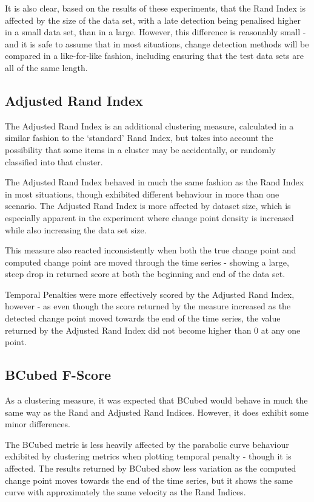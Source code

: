 \documentclass[../main.tex]{subfiles}
\begin{document}
It is also clear, based on the results of these experiments, that the Rand Index is affected by the size of the data set, with a late detection being penalised higher in a small data set, than in a large. However, this difference is reasonably small - and it is safe to assume that in most situations, change detection methods will be compared in a like-for-like fashion, including ensuring that the test data sets are all of the same length.

\subsection{Adjusted Rand Index}

The Adjusted Rand Index is an additional clustering measure, calculated in a similar fashion to the `standard' Rand Index, but takes into account the possibility that some items in a cluster may be accidentally, or randomly classified into that cluster.

The Adjusted Rand Index behaved in much the same fashion as the Rand Index in most situations, though exhibited different behaviour in more than one scenario. The Adjusted Rand Index is more affected by dataset size, which is especially apparent in the experiment where change point density is increased while also increasing the data set size.

This measure also reacted inconsistently when both the true change point and computed change point are moved through the time series - showing a large, steep drop in returned score at both the beginning and end of the data set.

Temporal Penalties were more effectively scored by the Adjusted Rand Index, however - as even though the score returned by the measure increased as the detected change point moved towards the end of the time series, the value returned by the Adjusted Rand Index did not become higher than 0 at any one point.

\subsection{BCubed F-Score}

As a clustering measure, it was expected that BCubed would behave in much the same way as the Rand and Adjusted Rand Indices. However, it does exhibit some minor differences.

The BCubed metric is less heavily affected by the parabolic curve behaviour exhibited by clustering metrics when plotting temporal penalty - though it is affected. The results returned by BCubed show less variation as the computed change point moves towards the end of the time series, but it shows the same curve with approximately the same velocity as the Rand Indices.
\end{document}
